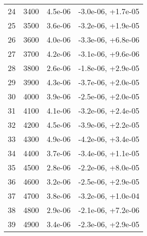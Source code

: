 \begin{table}
\begin{adjustbox}{width=1\textwidth/2}
\begin{tabular}{|c|c|c|c|}
\cline{1-4}
24 & 3400 & 4.5e-06 & -3.0e-06, +1.7e-05 \\
\cline{1-4}
25 & 3500 & 3.6e-06 & -3.2e-06, +1.9e-05 \\
\cline{1-4}
26 & 3600 & 4.0e-06 & -3.3e-06, +6.8e-06 \\
\cline{1-4}
27 & 3700 & 4.2e-06 & -3.1e-06, +9.6e-06 \\
\cline{1-4}
28 & 3800 & 2.6e-06 & -1.8e-06, +2.9e-05 \\
\cline{1-4}
29 & 3900 & 4.3e-06 & -3.7e-06, +2.0e-05 \\
\cline{1-4}
30 & 4000 & 3.9e-06 & -2.5e-06, +2.0e-05 \\
\cline{1-4}
31 & 4100 & 4.1e-06 & -3.2e-06, +2.4e-05 \\
\cline{1-4}
32 & 4200 & 4.5e-06 & -3.9e-06, +2.2e-05 \\
\cline{1-4}
33 & 4300 & 4.9e-06 & -4.2e-06, +3.4e-05 \\
\cline{1-4}
34 & 4400 & 3.7e-06 & -3.4e-06, +1.1e-05 \\
\cline{1-4}
35 & 4500 & 2.8e-06 & -2.2e-06, +8.0e-05 \\
\cline{1-4}
36 & 4600 & 3.2e-06 & -2.5e-06, +2.9e-05 \\
\cline{1-4}
37 & 4700 & 3.8e-06 & -3.2e-06, +1.0e-04 \\
\cline{1-4}
38 & 4800 & 2.9e-06 & -2.1e-06, +7.2e-06 \\
\cline{1-4}
39 & 4900 & 3.4e-06 & -2.3e-06, +2.9e-05 \\
\cline{1-4}
\end{tabular}
\end{adjustbox}
\end{table}


